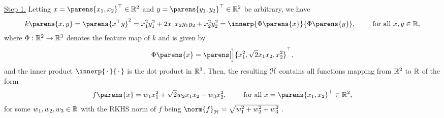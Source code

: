 	\underline{Step 1.} Letting $x = \parens{x_1, x_2}^\top \in \Real^2$ and $y = \parens{y_1, y_2}^\top \in \Real^2$ be arbitrary, we have 
	\begin{align*}
		k \parens{x, y} = \parens{x^\top y}^2 
		= x_1^2 y_1^2 + 2 x_1 x_2 y_1 y_2 + x_2^2 y_2^2 
		= \innerp{\Phi \parens{x}}{\Phi \parens{y}}, \qquad \text{ for all } x, y \in \Real, 
	\end{align*}
	where $\Phi: \mathbb{R}^2 \to \mathbb{R}^3$ denotes the feature map of $k$ and is given by 
	\begin{align*}
		\Phi \parens{x} = \parens[\Big]{x_1^2, \sqrt{2} x_1 x_2, x_2^2}^{\top}, %
	\end{align*}
	and the inner product $\innerp{\,\cdot\,}{\,\cdot\,}$ is the dot product in $\mathbb{R}^3$. Then, the resulting $\mathcal{H}$ contains all functions mapping from $\mathbb{R}^2$ to $\mathbb{R}$ of the form 
	\begin{align*}
		f \parens{x} 
		= w_1 x_1^2 + \sqrt{2} w_2 x_1 x_2 + w_3 x_2^2, \qquad \text{ for all } x = \parens{x_1, x_2}^\top \in \Real^2, 
	\end{align*}
	for some $w_1, w_2, w_3 \in \mathbb{R}$ with the RKHS norm of $f$ being $\norm{f}_{\calH} = \sqrt{w_1^2 + w_2^2 + w_3^2}$ \parencite[Theorem 4.21 in][]{Steinwart2008-tn}. 
	
